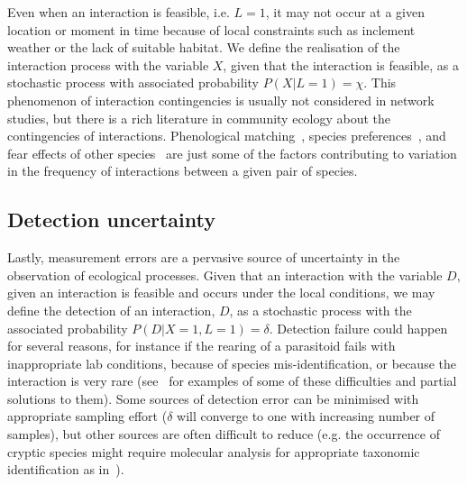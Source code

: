\documentclass[12pt]{article}
\begin{document}
\begin{spacing}{2.0}
    Even when an interaction is feasible, i.e. $L=1$, it may not occur at a given location or moment in time because of local constraints such as inclement weather or the lack of suitable habitat. We define the realisation of the interaction process with the variable $X$, given that the interaction is feasible, as a stochastic process with associated probability $P(X|L=1)=\chi$. This phenomenon of interaction contingencies is usually not considered in network studies, but there is a rich literature in community ecology about the contingencies of interactions. Phenological matching~\citep{MillerRushing2010,Gezon2016}, species preferences~\citep{Pires2011,Novak2015,Coux2016}, and fear effects of other species~\citep{Luttbeg2005,Wirsing2008} are just some of the factors contributing to variation in the frequency of interactions between a given pair of species.

    \subsection*{Detection uncertainty} 

    Lastly, measurement errors are a pervasive source of uncertainty in the observation of ecological processes. Given that an interaction with the variable $D$, given an interaction is feasible and occurs under the local conditions, we may define the detection of an interaction, $D$, as a stochastic process with the associated probability $P(D|X=1,L=1)=\delta$. Detection failure could happen for several reasons, for instance if the rearing of a parasitoid fails with inappropriate lab conditions, because of species mis-identification, or because the interaction is very rare (see~\citet{Wirta2014} for examples of some of these difficulties and partial solutions to them). Some sources of detection error can be minimised with appropriate sampling effort ($\delta$ will converge to one with increasing number of samples), but other sources are often difficult to reduce (e.g. the occurrence of cryptic species might require molecular analysis for appropriate taxonomic identification as in~\citealt{Wirta2014,Frost2016}).



\end{spacing}
\end{document}
